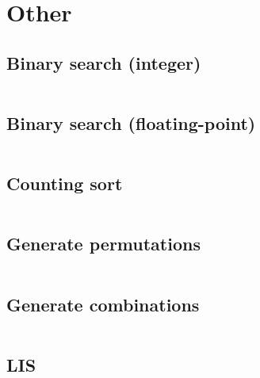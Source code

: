 \section{Other}
\subsection{Binary search (integer)}
\inputminted[frame=single,framesep=3pt,breaklines=true,tabsize=2,linenos,label=O(log(N))]{c++}{other/binary-search-integer.cpp}

\subsection{Binary search (floating-point)}
\inputminted[frame=single,framesep=3pt,breaklines=true,tabsize=2,linenos,label=O(log(N))]{c++}{other/binary-search-float.cpp}

\subsection{Counting sort}
\inputminted[frame=single,framesep=3pt,breaklines=true,tabsize=2,linenos,label=O(N)]{c++}{other/counting-sort.cpp}

\subsection{Generate permutations}
\inputminted[frame=single,framesep=3pt,breaklines=true,tabsize=2,linenos,label=O($N^K$)]{c++}{other/gen-permutations.cpp}

\subsection{Generate combinations}
\inputminted[frame=single,framesep=3pt,breaklines=true,tabsize=2,linenos,label=O($N \binom{N}{K}$)]{c++}{other/gen-combinations.cpp}

\subsection{LIS}
\inputminted[frame=single,framesep=3pt,breaklines=true,tabsize=2,linenos,label=O($N \binom{N}{K}$)]{c++}{other/lis.cpp}
